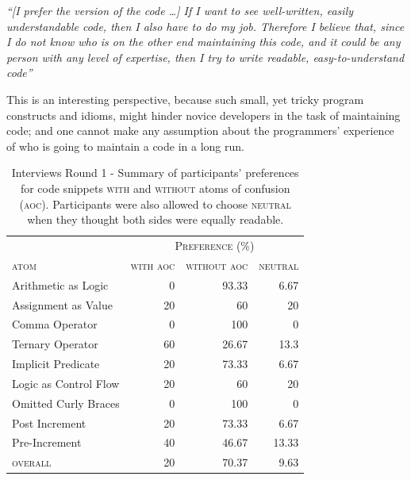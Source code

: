 \begin{mq}
\emph{``[I prefer the \rhs version of the code \ldots] If I want to see well-written, easily understandable code, then I also have to do my job. Therefore I believe that, since I do not know who is on the other end maintaining this code, and it could be any person with any level of expertise, then I try to write readable, easy-to-understand code''}
\end{mq}

This is an interesting perspective, because such small, yet tricky program constructs and idioms, might hinder novice developers in the task of maintaining code; and one cannot make any assumption about the programmers' experience of who is going to maintain a code in a long run.

\begin{table}[!htb]
    \centering
    \caption{Interviews Round 1 - Summary of participants' preferences for code snippets \textsc{with} and \textsc{without} atoms of confusion (\textsc{aoc}). Participants were also allowed to choose \textsc{neutral} when they thought both sides were equally readable.}
    \label{tab:interview-results1}
    \begin{tabular}{lrrr}\toprule
      & \multicolumn{3}{c}{\textsc{Preference (\%)}} \\
      \cmidrule(lr){2-4}
         \textsc{atom}           & \multicolumn{1}{c}{\textsc{with aoc}}
                                      &  \multicolumn{1}{c}{\textsc{without aoc}}
                                               & \multicolumn{1}{c}{\textsc{neutral}} \\ \midrule
         Arithmetic as Logic     & 0  & 93.33  & 6.67  \\
         Assignment as Value     & 20 & 60     & 20    \\
         Comma Operator          & 0  & 100    & 0     \\
         Ternary Operator        & 60 & 26.67  & 13.3  \\
         Implicit Predicate      & 20 & 73.33  & 6.67  \\
         Logic as Control Flow   & 20 & 60     & 20    \\
         Omitted Curly Braces    & 0  & 100    & 0     \\
         Post Increment          & 20 & 73.33  & 6.67  \\
         Pre-Increment           & 40 & 46.67  & 13.33 \\ \midrule
         \textsc{overall}        & 20 & 70.37  & 9.63  \\
         \bottomrule
    \end{tabular}
\end{table}


